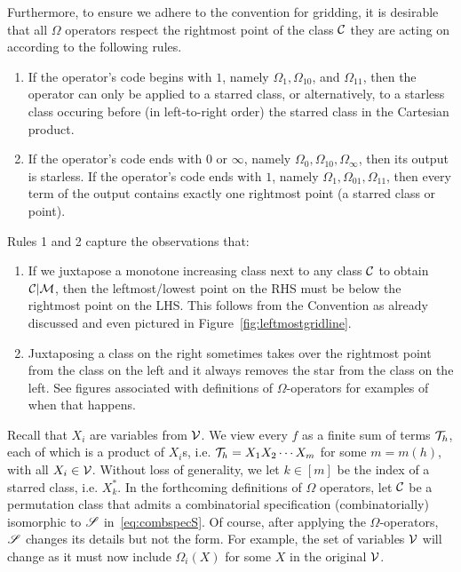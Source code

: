 \documentclass[12pt, a4paper, twoside]{report}
\begin{document}
Furthermore, to ensure we adhere to the convention for gridding, it is desirable that all $\Omega$ operators respect the rightmost point of the class $\mathcal{C}$ they are acting on according to the following rules.
\begin{enumerate}
\item If the operator's code begins with $1$, namely $\Omega_1,\Omega_{10}$, and $\Omega_{11}$, then the operator can only be applied to a starred class, or alternatively, to a starless class occuring before (in left-to-right order) the starred class in the Cartesian product.
\item If the operator's code ends with $0$ or $\infty$, namely $\Omega_0, \Omega_{10}, \Omega_\infty$, then its output is starless. If the operator's code ends with $1$, namely $\Omega_1, \Omega_{01}, \Omega_{11}$, then every term of the output contains exactly one rightmost point (a starred class or point).
\end{enumerate}
Rules 1 and 2 capture the observations that:
\begin{enumerate}
\item If we juxtapose a monotone increasing class next to any class $\mathcal{C}$ to obtain $\mathcal{C}|\mathcal{M}$, then the leftmost/lowest point on the RHS must be below the rightmost point on the LHS. This follows from the Convention as already discussed and even pictured in Figure~\ref{fig:leftmostgridline}.
\item Juxtaposing a class on the right sometimes takes over the rightmost point from the class on the left and it always removes the star from the class on the left. See figures associated with definitions of $\Omega$-operators for examples of when that happens.
\end{enumerate}

Recall that $X_i$ are variables from $\mathcal{V}$. We view every $f$ as a finite sum of terms $\mathcal{T}_h$, each of which is a product of $X_i$s, i.e. $\mathcal{T}_h = X_1X_2\cdots X_m$ for some $m = m(h)$, with all $X_i \in \mathcal{V}$. Without loss of generality, we let $k \in [m]$ be the index of a starred class, i.e. $X_k^*$. In the forthcoming definitions of $\Omega$ operators, let $\mathcal{C}$ be a permutation class that admits a combinatorial specification (combinatorially) isomorphic to $\mathscr{S}$ in~\eqref{eq:combspecS}. Of course, after applying the $\Omega$-operators, $\mathscr{S}$ changes its details but not the form. For example, the set of variables $\mathcal{V}$ will change as it must now include $\Omega_i(X)$ for some $X$ in the original $\mathcal{V}$.
\end{document}
